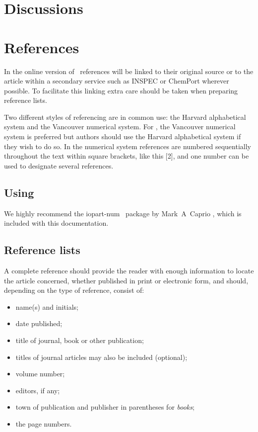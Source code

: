 \documentclass[a4paper]{jpconf}
\begin{document}
\section{Discussions}
\label{sec:discussions}

\section{References}
In the online version of \jpcs\ references will be linked to their original source or to the article within a secondary service such as INSPEC or ChemPort wherever possible. To facilitate this linking extra care should be taken when preparing reference lists. 

Two different styles of referencing are in common use: the Harvard alphabetical system and the Vancouver numerical system.  For \jpcs, the Vancouver numerical system is preferred but authors should use the Harvard alphabetical system if they wish to do so. In the numerical system references are numbered sequentially throughout the text within square brackets, like this [2], and one number can be used to designate several references.  

\subsection{Using \BibTeX}
We highly recommend the {\ttfamily\textbf\selectfont iopart-num} \BibTeX\ package by Mark~A~Caprio \cite{iopartnum}, which is included with this documentation.

\subsection{Reference lists}
A complete reference should provide the reader with enough information to locate the article concerned, whether published in print or electronic form, and should, depending on the type of reference, consist of:  

\begin{itemize}
\item name(s) and initials;
\item date published;
\item title of journal, book or other publication; 
\item titles of journal articles may also be included (optional);
\item volume number;
\item editors, if any;
\item town of publication and publisher in parentheses for {\it books};
\item the page numbers.
\end{itemize}
\end{document}
